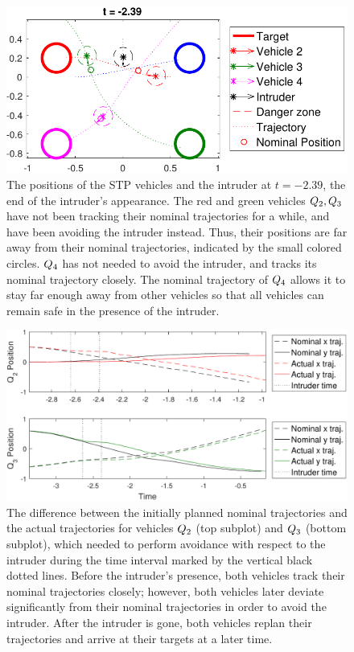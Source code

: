 \begin{figure}
  \centering
  \includegraphics[width=0.9\columnwidth]{fig/intruder1_traj}
  \caption{The positions of the STP vehicles and the intruder at $t=-2.39$, the end of the intruder's appearance. The red and green vehicles $Q_2, Q_3$ have not been tracking their nominal trajectories for a while, and have been avoiding the intruder instead. Thus, their positions are far away from their nominal trajectories, indicated by the small colored circles. $Q_4$ has not needed to avoid the intruder, and tracks its nominal trajectory closely. The nominal trajectory of $Q_4$ allows it to stay far enough away from other vehicles so that all vehicles can remain safe in the presence of the intruder.}
  \label{fig:intruder1_traj}
\end{figure}

\begin{figure}
  \centering
  \includegraphics[width=\columnwidth]{"fig/intruder1_diff"}
  \caption{The difference between the initially planned nominal trajectories and the actual trajectories for vehicles $Q_2$ (top subplot) and $Q_3$ (bottom subplot), which needed to perform avoidance with respect to the intruder during the time interval marked by the vertical black dotted lines. Before the intruder's presence, both vehicles track their nominal trajectories closely; however, both vehicles later deviate significantly from their nominal trajectories in order to avoid the intruder. After the intruder is gone, both vehicles replan their trajectories and arrive at their targets at a later time.}
  \label{fig:intruder1_diff}
\end{figure}